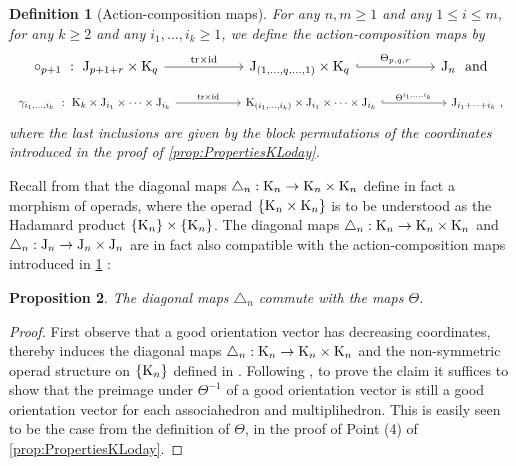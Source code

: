 \documentclass[twoside, 12pt]{amsart}
\newtheorem{definition}{Definition}[section]
\newtheorem{proposition}[definition]{Proposition}
\theoremstyle{remark}
\begin{document}
\begin{definition}[Action-composition maps] \label{def:action-composition}
For any $n,m\geq 1$ and any $1\leq i \leq m$, for any $k\geq 2$ and any $i_1,\ldots,i_k \geq 1$, we define the \emph{action-composition maps}  by 
\[
\vcenter{\hbox{
\begin{tikzcd}[column sep=1cm]
\circ_{p+1}\ : \ \J_{p+1+r}\times \K_q
\arrow[rr,  "\tr\times \id"]
& & 
\J_{(1,\ldots,q,\ldots,1)}\times \K_q 
\arrow[rr,hookrightarrow, "\Theta_{p,q,r}"]
&  &
\J_{n}\ \ \text{and}
\end{tikzcd}
}}
\]
\[
\vcenter{\hbox{
\begin{tikzcd}[column sep=1cm]
\gamma_{i_1,\ldots,i_k}\ : \ \K_{k}\times \J_{i_1} \times \cdots \times \J_{i_k}
\arrow[rr,  "\tr\times \id"]
& &
\K_{(i_1,\ldots,i_k)} \times \J_{i_1} \times \cdots \times \J_{i_k} 
\arrow[rr,hookrightarrow, "\Theta^{i_1, \ldots , i_k}"]
& &
\J_{i_1+\cdots + i_k}\ , 
\end{tikzcd}
}}
\]
where the last inclusions are given by the block permutations of the coordinates introduced in the proof of \cref{prop:PropertiesKLoday}. 
\end{definition}

Recall from \cite[Theorem 1]{MTTV19} that the diagonal maps $\triangle_n : \mathrm{K}_n \to \mathrm{K}_n \times \mathrm{K}_n$ define in fact a morphism of operads, where the operad $\{ \mathrm{K}_n \times \mathrm{K}_n \}$ is to be understood as the Hadamard product $\{ \mathrm{K}_n \} \times \{ \mathrm{K}_n \}$.
The diagonal maps $\triangle_n : \mathrm{K}_n \to \mathrm{K}_n \times \mathrm{K}_n$ and $\triangle_n : \mathrm{J}_n \to \mathrm{J}_n \times \mathrm{J}_n$ are in fact also compatible with the action-composition maps introduced in \cref{def:action-composition} :

\begin{proposition} 
\label{prop:thetacommutes}
The diagonal maps $\triangle_n$ commute with the maps $\Theta$.  
\end{proposition}

\begin{proof}
First observe that a good orientation vector has decreasing coordinates, thereby induces the diagonal maps $\triangle_n : \mathrm{K}_n \to \mathrm{K}_n \times \mathrm{K}_n$ and the non-symmetric operad structure on $\{\mathrm{K}_n\}$ defined in \cite{MTTV19}. 
Following \cite[Proposition 4.14]{LA21}, to prove the claim it suffices to show that the preimage under $\Theta^{-1}$ of a good orientation vector is still a good orientation vector for each associahedron and multiplihedron. 
This is easily seen to be the case from the definition of $\Theta$, in the proof of Point (4) of \cref{prop:PropertiesKLoday}. 
\end{proof}
\end{document}
